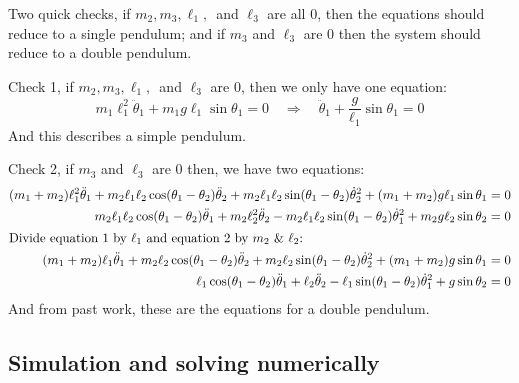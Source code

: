 \documentclass[letterpaper,8pt]{article}
\begin{document}
Two quick checks, if $m_2, m_3, \ell_1,$\ and $\ell_3$ are all $0$, then the equations should reduce to a single pendulum; and if 
$m_3$ and $\ell_3$ are $0$ then the system should reduce to a double pendulum.

Check 1, if $m_2, m_3, \ell_1,$\ and $\ell_3$ are 0, then we only have one equation:
\[
m_1\ell_1^2 \ddot{\theta}_1 + m_1 g \ell_1 \sin\theta_1 = 0
\quad \Rightarrow \quad
\ddot{\theta}_1 + \frac{g}{\ell_1}\sin \theta_1 = 0
\]
And this describes a simple pendulum.

Check 2, if $m_3$ and $\ell_3$ are $0$ then, we have two equations:
\begin{align*}
(m_1 + m_2)\ell_1^2 \ddot{\theta}_1 + m_2\ell_1\ell_2 \cos(\theta_1 - \theta_2)\ddot{\theta}_2 + m_2\ell_1\ell_2 \sin(\theta_1 - \theta_2)\dot{\theta}_2^2
                + (m_1 + m_2)g \ell_1 \sin \theta_1 &= 0 \\
m_2 \ell_1 \ell_2 \cos (\theta_1 - \theta_2) \ddot{\theta}_1 + m_2 \ell_2^2 \ddot{\theta}_2 - m_2 \ell_1 \ell_2 \sin (\theta_1 - \theta_2) \dot{\theta}_1^2
                + m_2 g \ell_2 \sin \theta_2 &= 0 \\
\intertext{Divide equation 1 by $\ell_1$ and equation 2 by $m_2$ \& $\ell_2$:}
(m_1 + m_2)\ell_1 \ddot{\theta}_1 + m_2\ell_2 \cos(\theta_1 - \theta_2)\ddot{\theta}_2 + m_2\ell_2 \sin(\theta_1 - \theta_2)\dot{\theta}_2^2
                + (m_1 + m_2)g \sin \theta_1 &= 0 \\
\ell_1 \cos (\theta_1 - \theta_2) \ddot{\theta}_1 + \ell_2 \ddot{\theta}_2 - \ell_1 \sin (\theta_1 - \theta_2) \dot{\theta}_1^2
                + g \sin \theta_2 &= 0 \\
\end{align*}
And from past work, these are the equations for a double pendulum.

\subsection{Simulation and solving numerically}
\end{document}
